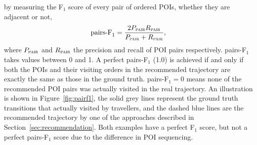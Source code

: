 by measuring the F$_1$ score of every pair of ordered POIs, whether they are adjacent or not,
\begin{displaymath}
\text{pairs-F}_1 = \frac{2 P_{\textsc{pair}} R_{\textsc{pair}}}
                        {P_{\textsc{pair}} + R_{\textsc{pair}}},
\end{displaymath}
where $P_{\textsc{pair}}$ and $R_{\textsc{pair}}$ the precision and recall of POI pairs respectively.
pairs-F$_1$ takes values between 0 and 1. A perfect pairs-F$_1$ (1.0) is achieved if and only if
both the POIs and their visiting orders in the
recommended trajectory are exactly the same as those in the ground truth.
pairs-F$_1 = 0$ means none of the recommended POI pairs was actually visited in the real trajectory.
An illustration is shown in Figure~\ref{fig:pairf1},
the solid grey lines represent the ground truth transitions that actually visited by travellers,
and the dashed blue lines are the recommended trajectory by one of the approaches described in Section~\ref{sec:recommendation}.
Both examples have a perfect F$_1$ score, but not a perfect pairs-F$_1$ score due to the difference in POI sequencing.




